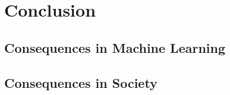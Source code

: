 
\chapter{Conclusion}
	
	\section{Consequences in Machine Learning}
	
	\section{Consequences in Society}
	